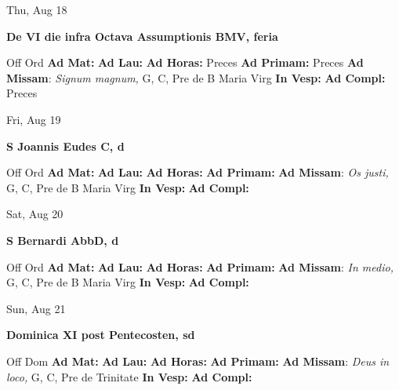 \documentclass[10pt]{article}
\begin{document}
\begin{minipage}{3.5in}
\vspace{2em}\begin{center}
Thu, Aug 18
\end{center}\textbf{ \large De VI die infra Octava Assumptionis BMV, \textnormal{\normalsize feria}}
\begin{justify}
Off Ord
\textbf{Ad Mat: }
\textbf{Ad Lau: }
\textbf{Ad Horas: }Preces
\textbf{Ad Primam: }Preces
\textbf{Ad Missam}: \textit{Signum magnum,} G, C, Pre de B Maria Virg
\textbf{In Vesp: }
\textbf{Ad Compl: }Preces\end{justify}
\end{minipage}



\begin{minipage}{3.5in}
\vspace{2em}\begin{center}
Fri, Aug 19
\end{center}\textbf{ \large S Joannis Eudes C, \textnormal{\normalsize d}}
\begin{justify}
Off Ord
\textbf{Ad Mat: }
\textbf{Ad Lau: }
\textbf{Ad Horas: }
\textbf{Ad Primam: }
\textbf{Ad Missam}: \textit{Os justi,} G, C, Pre de B Maria Virg
\textbf{In Vesp: }
\textbf{Ad Compl: }\end{justify}
\end{minipage}



\begin{minipage}{3.5in}
\vspace{2em}\begin{center}
Sat, Aug 20
\end{center}\textbf{ \large S Bernardi AbbD, \textnormal{\normalsize d}}
\begin{justify}
Off Ord
\textbf{Ad Mat: }
\textbf{Ad Lau: }
\textbf{Ad Horas: }
\textbf{Ad Primam: }
\textbf{Ad Missam}: \textit{In medio,} G, C, Pre de B Maria Virg
\textbf{In Vesp: }
\textbf{Ad Compl: }\end{justify}
\end{minipage}



\begin{minipage}{3.5in}
\vspace{2em}\begin{center}
Sun, Aug 21
\end{center}\textbf{ \large Dominica XI post Pentecosten, \textnormal{\normalsize sd}}
\begin{justify}
Off Dom
\textbf{Ad Mat: }
\textbf{Ad Lau: }
\textbf{Ad Horas: }
\textbf{Ad Primam: }
\textbf{Ad Missam}: \textit{Deus in loco,} G, C, Pre de Trinitate
\textbf{In Vesp: }
\textbf{Ad Compl: }\end{justify}
\end{minipage}
\end{document}
